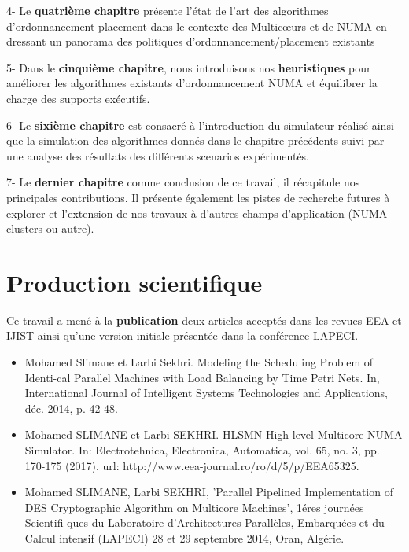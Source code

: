 \justify \hspace{\parindent}
4- Le \textbf{quatrième chapitre} présente l'état de l'art des algorithmes d'ordonnancement placement dans le contexte des Multicœurs et de NUMA en dressant un panorama des politiques d'ordonnancement/placement existants

\justify \hspace{\parindent}
5- Dans le \textbf{cinquième chapitre}, nous introduisons nos \textbf{heuristiques} pour améliorer les algorithmes existants d'ordonnancement NUMA et équilibrer la charge des supports exécutifs.

\justify \hspace{\parindent}
6- Le \textbf{sixième chapitre} est consacré à l'introduction du simulateur réalisé ainsi que la simulation des algorithmes  donnés dans le chapitre précédents suivi par une analyse des résultats des différents scenarios expérimentés.

\justify \hspace{\parindent}
7- Le \textbf{dernier chapitre} comme conclusion de ce travail, il récapitule nos principales contributions. Il présente également les pistes de recherche futures à explorer et l’extension de nos travaux à d’autres champs d’application (NUMA clusters ou autre).

\section{Production scientifique} 
\justify \hspace{\parindent}
Ce travail a mené à la \textbf{publication} deux articles acceptés dans les revues EEA  et IJIST ainsi qu’une version initiale présentée dans la conférence LAPECI.

\begin{itemize}
  \item Mohamed Slimane et Larbi Sekhri. Modeling the Scheduling Problem of Identi-cal Parallel Machines with Load Balancing by Time Petri Nets. In, International Journal of Intelligent Systems Technologies and Applications, déc. 2014, p. 42-48. \cite{slim1214}

  \item Mohamed SLIMANE et Larbi SEKHRI. HLSMN High level Multicore NUMA Simulator. In: Electrotehnica, Electronica, Automatica, vol. 65, no. 3, pp. 170-175 (2017). url: http://www.eea-journal.ro/ro/d/5/p/EEA65325. \cite{slim17}

  \item Mohamed SLIMANE, Larbi SEKHRI, 'Parallel Pipelined Implementation of DES Cryptographic Algorithm on Multicore Machines', 1éres journées Scientifi-ques du Laboratoire d’Architectures Parallèles, Embarquées et du Calcul intensif (LAPECI) 28 et 29 septembre 2014, Oran, Algérie.\cite{slim914}
\end{itemize}
